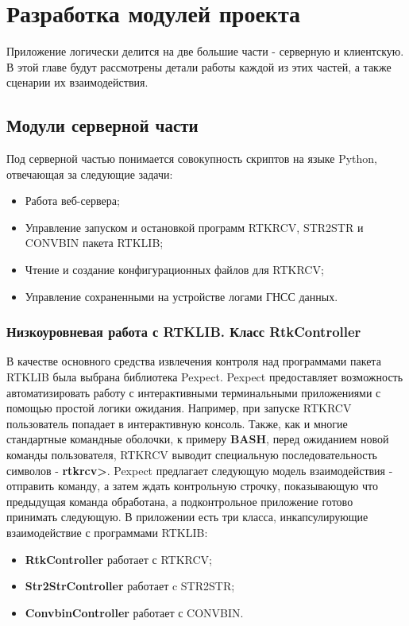 \chapter{Разработка модулей проекта} \label{chapt3}

Приложение логически делится на две большие части - серверную и клиентскую. В этой главе будут рассмотрены детали работы каждой из этих частей, а также сценарии их взаимодействия.

\section{Модули серверной части} \label{sect3_1}

Под серверной частью понимается совокупность скриптов на языке Python, отвечающая за следующие задачи:

\begin{itemize}
  \item Работа веб-сервера;
  \item Управление запуском и остановкой программ RTKRCV, STR2STR и CONVBIN пакета RTKLIB;
  \item Чтение и создание конфигурационных файлов для RTKRCV;
  \item Управление сохраненными на устройстве логами ГНСС данных.
\end{itemize}

\subsection{Низкоуровневая работа с RTKLIB. Класс RtkController} \label{subsect3_1_1}

В качестве основного средства извлечения контроля над программами пакета RTKLIB была выбрана библиотека Pexpect. Pexpect \cite{pexpect-docs} предоставляет возможность автоматизировать работу с интерактивными терминальными приложениями с помощью простой логики ожидания. Например, при запуске RTKRCV пользователь попадает в интерактивную консоль. Также, как и многие стандартные командные оболочки, к примеру \textbf{BASH}, перед ожиданием новой команды пользователя, RTKRCV выводит специальную последовательность символов - \textbf{rtkrcv>}. Pexpect предлагает следующую модель взаимодействия - отправить команду, а затем ждать контрольную строчку, показывающую что предыдущая команда обработана, а подконтрольное приложение готово принимать следующую. В приложении есть три класса, инкапсулирующие взаимодействие с программами RTKLIB:

\begin{itemize}
  \item \textbf{RtkController} работает с RTKRCV;
  \item \textbf{Str2StrController} работает c STR2STR;
  \item \textbf{ConvbinController} работает с CONVBIN.
\end{itemize}

